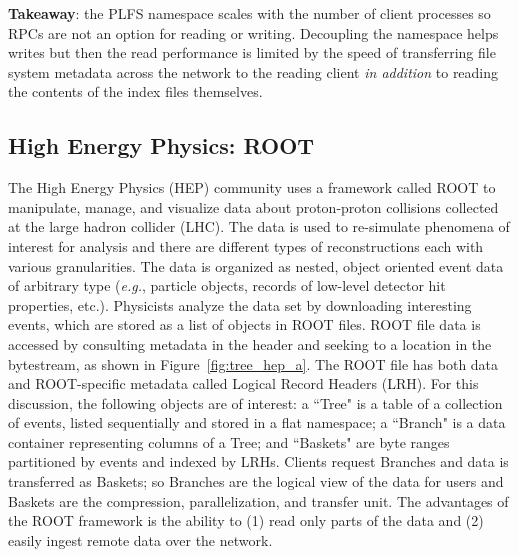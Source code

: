 \textbf{Takeaway}: the PLFS namespace scales with the number of client
processes so RPCs are not an option for reading or writing.  Decoupling the
namespace helps writes but then the read performance is limited by the speed of
transferring file system metadata across the network to the reading client {\it
in addition} to reading the contents of the index files themselves.

\subsection{High Energy Physics: ROOT}
\label{sec:hep}

The High Energy Physics (HEP) community uses a framework called ROOT to
manipulate, manage, and visualize data about proton-proton collisions collected
at the large hadron collider (LHC). The data is used to re-simulate phenomena
of interest for analysis and there are different types of reconstructions each
with various granularities. The data is organized as nested, object oriented
event data of arbitrary type ({\it e.g.}, particle objects, records of
low-level detector hit properties, etc.).  Physicists analyze the data set by
downloading interesting events, which are stored as a list of objects in ROOT
files.  ROOT file data is accessed by consulting metadata in the header and
seeking to a location in the bytestream, as shown in
Figure~\ref{fig:tree_hep_a}.  The ROOT file has both data and ROOT-specific
metadata called Logical Record Headers (LRH).  For this discussion, the
following objects are of interest: a ``Tree" is a table of a collection of
events, listed sequentially and stored in a flat namespace; a ``Branch" is a
data container representing columns of a Tree; and ``Baskets" are byte ranges
partitioned by events and indexed by LRHs.  Clients request Branches and data
is transferred as Baskets; so Branches are the logical view of the data for
users and Baskets are the compression, parallelization, and transfer unit.  The
advantages of the ROOT framework is the ability to (1) read only parts of the
data and (2) easily ingest remote data over the network.  



